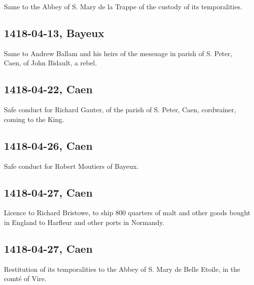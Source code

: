 \documentclass[a4paper,12pt,twoside]{book}
\begin{document}
                
                     Same to the Abbey of S. Mary de la Trappe of the custody of its temporalities.
                  
                
                \subsection{1418-04-13, Bayeux}
                
                
                     Same to Andrew Ballam and his heirs of the messuage in parish of S. Peter, Caen, of John Bidault, a rebel.
                  
                
                \subsection{1418-04-22, Caen}
                
                
                     Safe conduct for Richard Gauter, of the parish of S. Peter, Caen, cordwainer, coming to the King.
                  
                
                \subsection{1418-04-26, Caen}
                
                
                     Safe conduct for Robert Moutiers of Bayeux.
                  
                
                \subsection{1418-04-27, Caen}
                
                
                     Licence to Richard Bristowe, to ship 800 quarters of malt and other goods bought in England to Harfleur and other ports in Normandy.
                  
                
                \subsection{1418-04-27, Caen}
                
                
                     Restitution of its temporalities to the Abbey of S. Mary de Belle Etoile, in the comté of Vire.
                  
\end{document}
